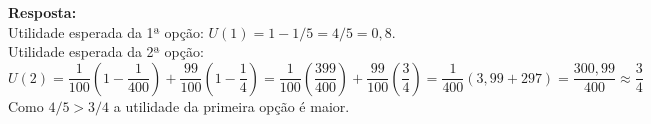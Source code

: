 \begin{enumerate}
\textbf{Resposta:}\\

Utilidade esperada da 1ª opção: {$ U(1) = 1 - 1/5 = 4/5 = 0,8.$}\\

Utilidade esperada da 2ª opção: {$ U(2) = \dfrac{1}{100} \left( 1 - \dfrac{1}{400} \right) + \dfrac{99}{100} \left( 1 - \dfrac{1}{4} \right) = \dfrac{1}{100} \left(\dfrac{399}{400} \right) + \dfrac{99}{100} \left(\dfrac{3}{4} \right) = \dfrac{1}{400} (3,99 + 297) = \dfrac{300,99}{400} \approx \dfrac{3}{4}$}\\

Como {$4/5 > 3/4$} a utilidade da primeira opção é maior.



\end{enumerate}

